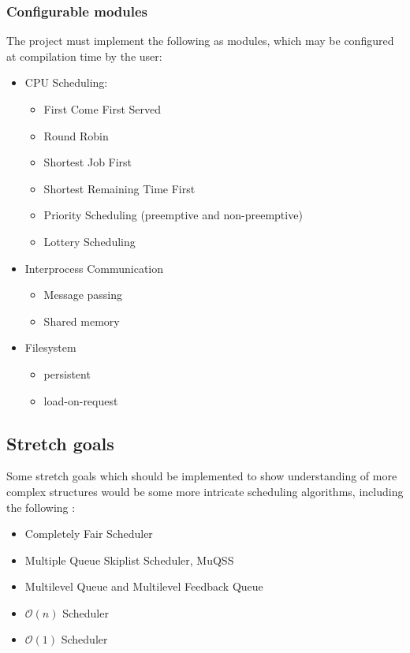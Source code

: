 \documentclass[10pt,a4paper]{article}
\begin{document}
\subsubsection*{Configurable modules}
The project must implement the following as modules, which may be configured at
compilation time by the user:
\begin{itemize}
    \item CPU Scheduling:
        \begin{itemize}
            \item First Come First Served
            \item Round Robin
            \item Shortest Job First
            \item Shortest Remaining Time First
            \item Priority Scheduling (preemptive and non-preemptive)
            \item Lottery Scheduling
        \end{itemize}
    \item Interprocess Communication
        \begin{itemize}
            \item Message passing
            \item Shared memory
        \end{itemize}
    \item Filesystem
        \begin{itemize}
            \item persistent
            \item load-on-request
        \end{itemize}
\end{itemize}

\subsection*{Stretch goals}
Some stretch goals which should be implemented to show understanding of more
complex structures would be some more intricate scheduling algorithms, including
the following \cite{CFS,BFS,DinosaurCPU,O(n)Scheduler,O(1)Scheduler}:
\begin{itemize}
    \item Completely Fair Scheduler
    \item Multiple Queue Skiplist Scheduler, MuQSS
    \item Multilevel Queue and Multilevel Feedback Queue
    \item $\mathcal{O}(n)$ Scheduler
    \item $\mathcal{O}(1)$ Scheduler
\end{itemize}
\end{document}
